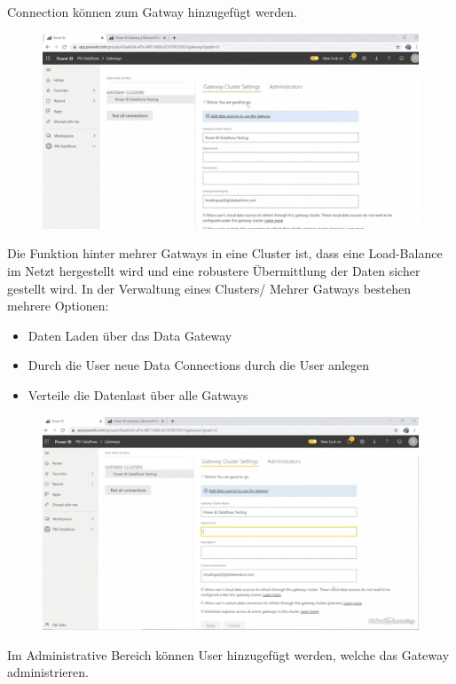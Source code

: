 Connection können zum Gatway hinzugefügt werden.
\begin{figure}[H]
	\centering
	\includegraphics[scale = 0.3]{attachment/chapter_1/Scc126}
\end{figure}

Die Funktion hinter mehrer Gatways in eine Cluster ist, dass eine Load-Balance im Netzt hergestellt wird und eine robustere Übermittlung der Daten sicher gestellt wird. In der Verwaltung eines Clusters/ Mehrer Gatways bestehen mehrere Optionen:
\begin{itemize}
	\item Daten Laden über das Data Gateway
	\item Durch die User neue Data Connections durch die User anlegen
	\item Verteile die Datenlast über alle Gatways
\end{itemize}

\begin{figure}[H]
	\centering
	\includegraphics[scale = 0.3]{attachment/chapter_1/Scc135}
\end{figure}

Im Administrative Bereich können User hinzugefügt werden, welche das Gateway administrieren.

